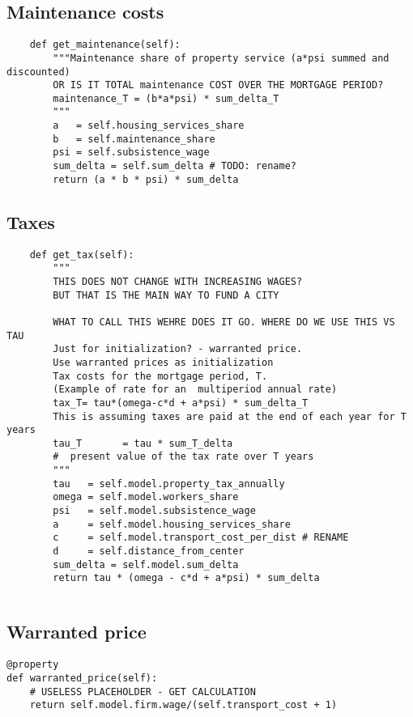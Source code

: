 \subsection{Maintenance costs}
\begin{lstlisting}
    def get_maintenance(self):
        """Maintenance share of property service (a*psi summed and discounted)
        OR IS IT TOTAL maintenance COST OVER THE MORTGAGE PERIOD?
        maintenance_T = (b*a*psi) * sum_delta_T
        """
        a   = self.housing_services_share
        b   = self.maintenance_share
        psi = self.subsistence_wage
        sum_delta = self.sum_delta # TODO: rename?
        return (a * b * psi) * sum_delta
\end{lstlisting}

\subsection{Taxes}
\begin{lstlisting}
    def get_tax(self):
        """ 
        THIS DOES NOT CHANGE WITH INCREASING WAGES?
        BUT THAT IS THE MAIN WAY TO FUND A CITY

        WHAT TO CALL THIS WEHRE DOES IT GO. WHERE DO WE USE THIS VS TAU
        Just for initialization? - warranted price. 
        Use warranted prices as initialization
        Tax costs for the mortgage period, T. 
        (Example of rate for an  multiperiod annual rate)
        tax_T= tau*(omega-c*d + a*psi) * sum_delta_T
        This is assuming taxes are paid at the end of each year for T years
        tau_T       = tau * sum_T_delta 
        #  present value of the tax rate over T years        
        """
        tau   = self.model.property_tax_annually
        omega = self.model.workers_share
        psi   = self.model.subsistence_wage
        a     = self.model.housing_services_share
        c     = self.model.transport_cost_per_dist # RENAME
        d     = self.distance_from_center
        sum_delta = self.model.sum_delta
        return tau * (omega - c*d + a*psi) * sum_delta
\end{lstlisting}

\begin{lstlisting}

\end{lstlisting}




\subsection{Warranted price}
\begin{lstlisting}
@property
def warranted_price(self):
    # USELESS PLACEHOLDER - GET CALCULATION
    return self.model.firm.wage/(self.transport_cost + 1) 
\end{lstlisting}

